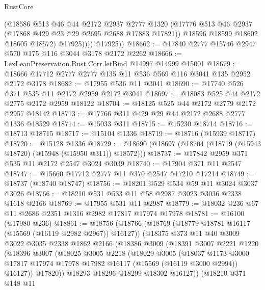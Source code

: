 \begin{lexlean}{RustCore}
\begin{coremodule}
                (@18586
                  @513
                  @46
                  @44
                  @2172
                  @2937
                  @2777
                  @1320
                  (@17776 @513 @46 @2937 (@17868 @429 @23 @29 @2695 @2688 @17883 @17821))
                  @18596
                  @18599
                  @18602
                  @18605
                  @18572)
                @17925))))
        @17925))
@18662 := @17840 @2777 @15746 @2947 @570 @175 @116 @3044 @3178 @2172 @2262
@18666 := LexLeanPreservation.Rust.Corr.letBind @14997 @14999 @15001
@18679 := @18666 @17712 @2777 @2777 @135 @11 @536 @569 @116 @3041 @135 @2952 @2172 @3178
@18682 := @17955 @536 @11 @3041
@18690 := @17740 @526 @371 @535 @11 @2172 @2959 @2172 @3041
@18697 := @18083 @525 @44 @2172 @2775 @2172 @2959 @18122
@18704 := @18125 @525 @44 @2172 @2779 @2172 @2957 @18142
@18713 := @17766 @311 @429 @29 @44 @2172 @2688 @2777 @1336 @18529
@18714 := @15033 @311
@18715 := @15230 @18714
@18716 := @18713 @18715
@18717 := @15104 @1336
@18719 := @18716 (@15939 @18717)
@18720 := @15128 @1336
@18729 := @18690 (@18697 (@18704 (@18719 (@15943 @18720) (@15948 (@15950 @311)) @18572)))
@18737 := @17842 @2959 @371 @535 @11 @2172 @2547 @3024 @3039
@18740 := @17904 @371 @11 @2547
@18747 := @15660 @17712 @2777 @11 @370 @2547 @17210 @17214
@18749 := @18737 (@18740 @18747)
@18756 := @18201 @529 @534 @59 @11 @3024 @3037 @3026
@18766 := @18210 @531 @533 @11 @58 @2987 @3023 @3036 @2338 @1618 @2166
@18769 := @17955 @531 @11 @2987
@18779 := @18032 @236 @67 @11 @2686 @2351 @1316 @2982 @17817 @17974 @17978
@18781 := @16100 (@17980 @236)
@18861 := @18756
    (@18766
      (@18769 (@18779 @18781 @16117 (@15569 (@16119 @2982 @2967)) @16127))
      (@18375
        @373
        @11
        @40
        @3009
        @3022
        @3035
        @2338
        @1862
        @2166
        (@18386
          @3009
          (@18391
            @3007
            @2221
            @1220
            (@18396
              @3007
              (@18025
                @3005
                @2218
                (@18029
                  @3005
                  (@18037
                    @1173
                    @3000
                    @17817
                    @17974
                    @17978
                    @17982
                    @16117
                    (@15569 (@16119 @3000 @2994))
                    @16127))
                @17820))
            @18293
            @18296
            @18299
            @18302
            @16127))
        (@18210
          @371
          @148
          @11

\end{coremodule}
\end{lexlean}
